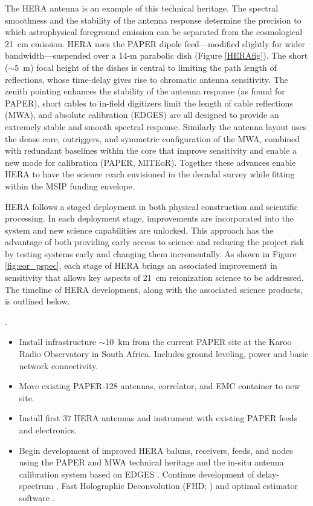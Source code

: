 \documentclass[preprint]{aastex}
\begin{document}
The HERA antenna is an example of this technical heritage. The spectral
smoothness and the stability of the antenna response determine the precision to
which astrophysical foreground emission can be separated from the cosmological
21~cm emission. HERA uses the PAPER dipole feed---modified slightly for wider
bandwidth---suspended over a 14-m parabolic dish (Figure \ref{HERAfig}). The
short ($\sim$5~m) focal height of the dishes is central to limiting the path
length of reflections, whose time-delay gives rise to chromatic antenna
sensitivity. The zenith pointing enhances the stability of the antenna response
(as found for PAPER), short cables to in-field digitizers limit the length of cable
reflections (MWA), and absolute calibration (EDGES) are all designed to provide
an extremely stable and smooth spectral response. Similarly the antenna layout
uses the dense core, outriggers, and symmetric configuration of the MWA,
combined with redundant baselines within the core that improve sensitivity
and enable a new mode for calibration (PAPER, MITEoR). Together
these advances enable HERA to have the science reach envisioned in the decadal
survey while fitting within the MSIP funding envelope.

HERA follows a staged deployment in both physical construction and scientific processing.  In
each deployment stage, improvements are incorporated into the system and new
science capabilities are unlocked.  This approach has the advantage of both
providing early access to science and reducing the project risk by testing systems
early and changing them incrementally.  As shown in Figure \ref{fig:eor_pspec}, each
stage of HERA brings an associated improvement in sensitivity that allows key
aspects of 21~cm reionization science to be addressed.  The timeline of HERA
development, along with the associated science products, is outlined below. 

.  
\begin{itemize}\setlength{\parskip}{0pt}\itemsep0pt
\vspace{-7pt}
  \item Install infrastructure $\sim$10~km from the current PAPER site at the Karoo Radio Observatory in South Africa. Includes ground leveling, power and basic network connectivity.
  \item Move existing PAPER-128 antennas, correlator, and EMC container to new site.
  \item Install first 37 HERA antennas and instrument with existing PAPER feeds and electronics. 
  \item Begin development of improved HERA baluns, receivers, feeds, and 
nodes using the PAPER and MWA technical heritage \citep{bradley_et_al2005,lonsdale_et_al2009_trunc,tingay_et_al2013_trunc} 
and the in-situ antenna calibration system based 
on EDGES \citep{rogers_2012}. Continue development of delay-spectrum \citep{parsons_et_al2012b}, 
Fast Holographic Deconvolution (FHD; \citealt{sullivan_et_al2012_trunc}) and 
optimal estimator software \citep{dillon_et_al2013b_trunc}.
\end{itemize}
\end{document}
